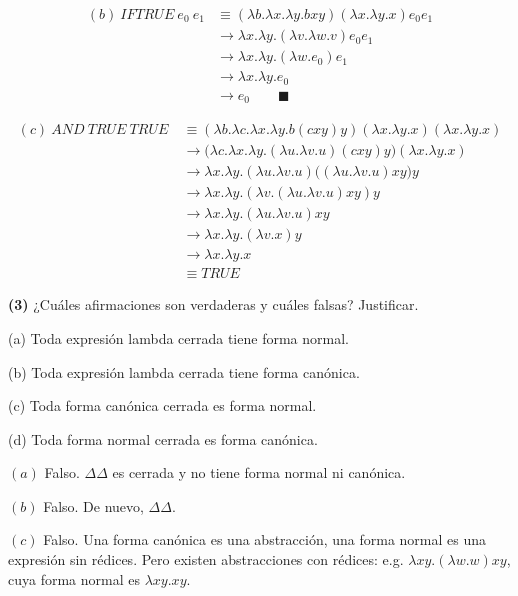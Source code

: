 \documentclass[article, 12pt]{article}
\begin{document}
\begin{align*}
  (b) ~ IF TRUE ~ e_0 ~ e_1 
  &\equiv (\lambda b. \lambda x. \lambda y. bxy) (\lambda x. \lambda y. x)e_0
  e_1 \\ 
  &\to \lambda x. \lambda y. (\lambda v. \lambda w. v)e_0 e_1 \\ 
  &\to \lambda x. \lambda y.(\lambda w. e_0)e_1 \\ 
  &\to \lambda x. \lambda y. e_0 \\ 
  &\to e_0 \qquad \blacksquare
\end{align*}

\begin{align*}
  (c) ~ AND ~ TRUE ~ TRUE ~ 
  &\equiv (\lambda b. \lambda c. \lambda x. \lambda y. b(cxy)y)(\lambda x.
  \lambda y. x)(\lambda x. \lambda y. x) \\ 
  &\to \Big( \lambda c. \lambda x. \lambda y.(\lambda u. \lambda v. u)(cxy)y
  \Big)(\lambda x. \lambda y. x) \\ 
  &\to \lambda x. \lambda y. (\lambda u. \lambda v. u)\big( (\lambda u. \lambda
  v. u)xy \big)y \\ 
  &\to \lambda x. \lambda y. (\lambda v.(\lambda u. \lambda v. u)xy) y \\ 
  &\to \lambda x. \lambda y. (\lambda u. \lambda v. u)xy \\ 
  &\to \lambda x. \lambda y. (\lambda v. x) y \\ 
  &\to  \lambda x. \lambda y. x \\ 
  &\equiv TRUE
\end{align*}


\pagebreak

\begin{myframe}
  \textbf{(3)} ¿Cuáles afirmaciones son verdaderas y cuáles falsas? Justificar.

  (a) Toda expresión lambda cerrada tiene forma normal.

  (b) Toda expresión lambda cerrada tiene forma canónica.

  (c) Toda forma canónica cerrada es forma normal.

  (d) Toda forma normal cerrada es forma canónica.
\end{myframe}


$(a)$ Falso. $\Delta \Delta$ es cerrada y no tiene forma normal ni canónica. 

$(b)$ Falso. De nuevo, $\Delta \Delta$. 

$(c)$ Falso. Una forma canónica es una abstracción, una forma normal es una
expresión sin rédices. Pero existen abstracciones con rédices: e.g. $\lambda
xy.(\lambda w.w)xy$, cuya forma normal es $\lambda xy.xy$.
\end{document}
